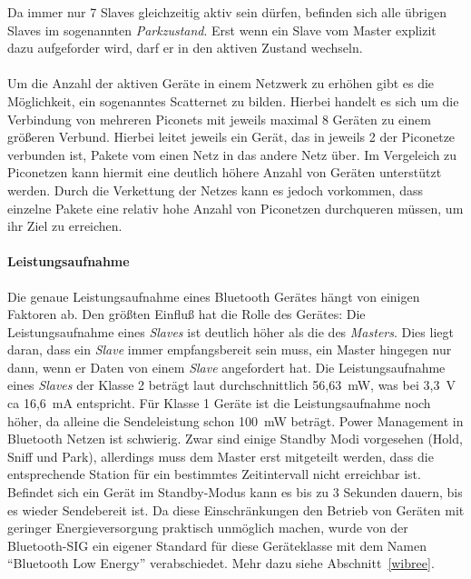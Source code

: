                 Da immer nur 7 Slaves gleichzeitig aktiv sein dürfen, befinden sich 
                alle übrigen Slaves im sogenannten \textsl{Parkzustand}. Erst wenn
                ein Slave vom Master explizit dazu aufgeforder wird, darf er in den
                aktiven Zustand wechseln. \\
                \\
                Um die Anzahl der aktiven Geräte in einem Netzwerk zu erhöhen
                gibt es die Möglichkeit, ein sogenanntes Scatternet zu bilden.
                Hierbei handelt es sich um die Verbindung von mehreren Piconets
                mit jeweils maximal 8 Geräten zu einem größeren Verbund. Hierbei
                leitet jeweils ein Gerät, das in jeweils 2 der Piconetze 
                verbunden ist, Pakete vom einen Netz in das andere Netz über.
                Im Vergeleich zu Piconetzen kann hiermit eine deutlich höhere
                Anzahl von Geräten unterstützt werden. Durch die Verkettung 
                der Netzes kann es jedoch vorkommen, dass einzelne Pakete
                eine relativ hohe Anzahl von Piconetzen durchqueren müssen,
                um ihr Ziel zu erreichen.
            \paragraph{Leistungsaufnahme}
                Die genaue Leistungsaufnahme eines Bluetooth Gerätes hängt von 
                einigen Faktoren ab. Den größten Einfluß hat die Rolle des 
                Gerätes: Die Leistungsaufnahme eines \textsl{Slaves} ist
                deutlich höher als die des \textsl{Masters}. Dies liegt
                daran, dass ein \textsl{Slave} immer empfangsbereit sein
                muss, ein Master hingegen nur dann, wenn er Daten von
                einem \textsl{Slave} angefordert hat. Die Leistungsaufnahme
                eines \textsl{Slaves} der Klasse 2 beträgt laut \citep{BluetoothPower}
                durchschnittlich 56,63~mW, was bei 3,3~V ca 16,6~mA entspricht.
                Für Klasse 1 Geräte ist die Leistungsaufnahme noch höher, 
                da alleine die Sendeleistung schon 100~mW beträgt.
                Power Management in Bluetooth Netzen ist schwierig. Zwar sind
                einige Standby Modi vorgesehen (Hold, Sniff und Park), allerdings
                muss dem Master erst mitgeteilt werden, dass die entsprechende
                Station für ein bestimmtes Zeitintervall nicht erreichbar ist.
                Befindet sich ein Gerät im Standby-Modus kann es bis zu 3 Sekunden
                dauern, bis es wieder Sendebereit ist. Da diese Einschränkungen
                den Betrieb von Geräten mit geringer Energieversorgung
                praktisch unmöglich machen, wurde von der Bluetooth-SIG
                ein eigener Standard für diese Geräteklasse mit dem Namen
                "`Bluetooth Low Energy"' verabschiedet. Mehr dazu siehe
                Abschnitt~\ref{wibree}.

